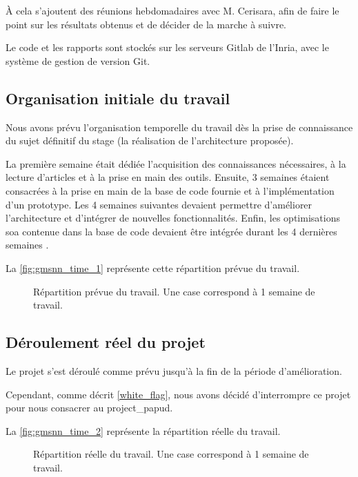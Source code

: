À cela s'ajoutent des réunions hebdomadaires avec M. Cerisara, afin de faire le point sur les résultats obtenus et de décider de la marche à suivre.

Le code et les rapports sont stockés sur les serveurs Gitlab de l'Inria, avec le système de gestion de version Git.

\subsection{Organisation initiale du travail}
Nous avons prévu l'organisation temporelle du travail dès la prise de connaissance du sujet définitif du stage (la réalisation de l'architecture proposée).

La première semaine était dédiée l'acquisition des connaissances nécessaires, à la lecture d'articles et à la prise en main des outils.
Ensuite, 3 semaines étaient consacrées à la prise en main de la base de code fournie et à l'implémentation d'un prototype.
Les 4 semaines suivantes devaient permettre d'améliorer l'architecture et d'intégrer de nouvelles fonctionnalités.
Enfin, les optimisations \gls{soa} contenue dans la base de code devaient être intégrée durant les 4 dernières semaines .

La \autoref{fig:gmsnn_time_1} représente cette répartition prévue du travail.

\begin{figure}[ht]
	\centering
	\caption[Répartition prévue du travail]{Répartition prévue du travail. Une case correspond à 1 semaine de travail.}\label{fig:gmsnn_time_1}
\end{figure}

\subsection{Déroulement réel du projet}
Le projet s'est déroulé comme prévu jusqu'à la fin de la période d'amélioration.

Cependant, comme décrit \autoref{white_flag}, nous avons décidé d'interrompre ce projet pour nous consacrer au \gls{project_papud}.

La \autoref{fig:gmsnn_time_2} représente la répartition réelle du travail.

\begin{figure}[ht]
	\centering
	\caption[Répartition réelle du travail]{Répartition réelle du travail. Une case correspond à 1 semaine de travail.}\label{fig:gmsnn_time_2}
\end{figure}

